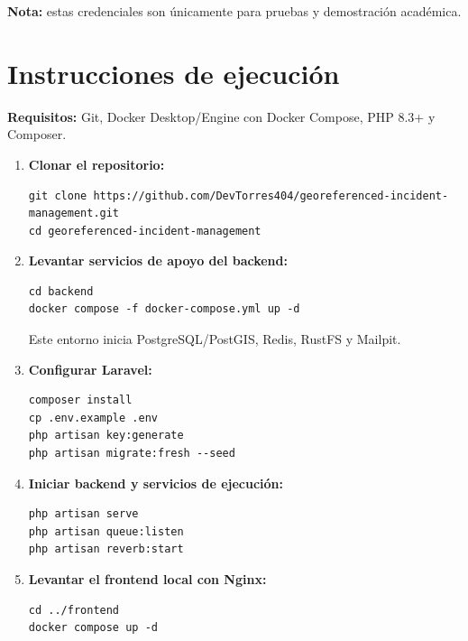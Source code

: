 \documentclass[12pt,a4paper]{article}
\begin{document}
\textbf{Nota:} estas credenciales son únicamente para pruebas y demostración académica.

\section{Instrucciones de ejecución}

\textbf{Requisitos:} Git, Docker Desktop/Engine con Docker Compose, PHP 8.3+ y Composer.

\begin{enumerate}
    \item \textbf{Clonar el repositorio:}
\begin{verbatim}
git clone https://github.com/DevTorres404/georeferenced-incident-management.git
cd georeferenced-incident-management
\end{verbatim}

    \item \textbf{Levantar servicios de apoyo del backend:}
\begin{verbatim}
cd backend
docker compose -f docker-compose.yml up -d
\end{verbatim}
    Este entorno inicia PostgreSQL/PostGIS, Redis, RustFS y Mailpit.

    \item \textbf{Configurar Laravel:}
\begin{verbatim}
composer install
cp .env.example .env
php artisan key:generate
php artisan migrate:fresh --seed
\end{verbatim}

    \item \textbf{Iniciar backend y servicios de ejecución:}
\begin{verbatim}
php artisan serve
php artisan queue:listen
php artisan reverb:start
\end{verbatim}

    \item \textbf{Levantar el frontend local con Nginx:}
\begin{verbatim}
cd ../frontend
docker compose up -d
\end{verbatim}

\end{enumerate}



\end{document}
